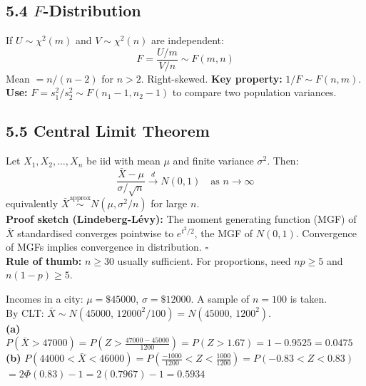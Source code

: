 \documentclass[12pt]{article}
\begin{document}
\subsection{5.4 $F$-Distribution}

\begin{defbox}[$F$-Distribution $F(m,n)$]
If $U\sim\chi^2(m)$ and $V\sim\chi^2(n)$ are independent:
\[F=\frac{U/m}{V/n}\sim F(m,n)\]
Mean $=n/(n-2)$ for $n>2$. Right-skewed. \textbf{Key property:} $1/F\sim F(n,m)$.\\[4pt]
\textbf{Use:} $F=s_1^2/s_2^2\sim F(n_1-1,n_2-1)$ to compare two population variances.
\end{defbox}

\subsection{5.5 Central Limit Theorem}

\begin{thmbox}
Let $X_1,X_2,\ldots,X_n$ be iid with mean $\mu$ and finite variance $\sigma^2$. Then:
\[\frac{\bar X-\mu}{\sigma/\sqrt{n}}\xrightarrow{d}N(0,1)\quad\text{as }n\to\infty\]
equivalently $\bar X\overset{\text{approx}}{\sim}N(\mu,\sigma^2/n)$ for large $n$.\\[6pt]
\textbf{Proof sketch (Lindeberg-Lévy):} The moment generating function (MGF) of $\bar X$ standardised converges pointwise to $e^{t^2/2}$, the MGF of $N(0,1)$. Convergence of MGFs implies convergence in distribution. \hfill$\square$\\[4pt]
\textbf{Rule of thumb:} $n\geq30$ usually sufficient. For proportions, need $np\geq5$ and $n(1-p)\geq5$.
\end{thmbox}

\begin{examplebox}
Incomes in a city: $\mu=\$45000$, $\sigma=\$12000$. A sample of $n=100$ is taken.\\[4pt]
By CLT: $\bar X\sim N(45000,\,12000^2/100)=N(45000,\,1200^2)$.\\[6pt]
\textbf{(a)} $P(\bar X>47000)=P\!\left(Z>\frac{47000-45000}{1200}\right)=P(Z>1.67)=1-0.9525=\mathbf{0.0475}$\\[6pt]
\textbf{(b)} $P(44000<\bar X<46000)=P\!\left(\frac{-1000}{1200}<Z<\frac{1000}{1200}\right)=P(-0.83<Z<0.83)$\\
$=2\Phi(0.83)-1=2(0.7967)-1=\mathbf{0.5934}$
\end{examplebox}
\end{document}
